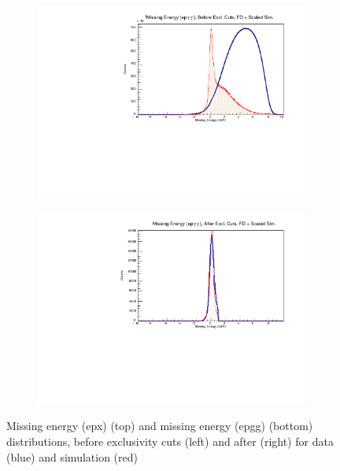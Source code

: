 \begin{figure}[!htb]
\begin{subfigure}{.5\textwidth}
        \end{subfigure}
        \begin{subfigure}{.5\textwidth}
            \centering
            \includegraphics[width=1\textwidth]{figures/Simulation/exclusivity/hist_missing_energy_epgg_prexcut_fd_Double.pdf}
        \end{subfigure}%
        \begin{subfigure}{.5\textwidth}
            \centering
            \includegraphics[width=1\textwidth]{figures/Simulation/exclusivity/hist_missing_energy_epgg_excut_fd_Double.pdf}
        \end{subfigure}
        \caption[short]{Missing energy (epx) (top) and missing energy (epgg) (bottom) distributions, before exclusivity cuts (left) and after (right) for data (blue) and simulation (red)}
    \label{fig:ME}
    \end{figure}
    
    
    \clearpage